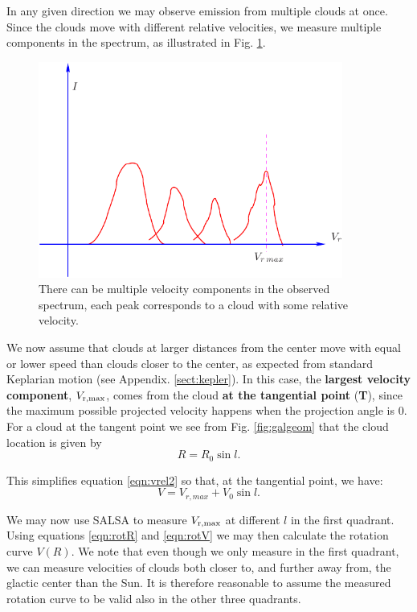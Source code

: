 In any given direction we may observe emission from multiple clouds at once. Since the clouds
move with different relative velocities, we measure multiple components in the spectrum, as illustrated
in Fig. \ref{fig:vmax}. 
\begin{figure}[ht]
\begin{center}
\includegraphics[width=10cm]{../figures/vmax.pdf}
\end{center}
\caption{There can be multiple velocity components in the observed spectrum, each peak corresponds
to a cloud with some relative velocity.}
\label{fig:vmax}
\end{figure}
We now assume that clouds at larger distances from the center move with equal
or lower speed than clouds closer to the center, as expected from standard
Keplarian motion (see Appendix. \ref{sect:kepler}).  In this case, the {\bf
largest velocity component}, $V_{\rm r,max}$, comes from the cloud {\bf at the
tangential point} ({\bf T}), since the maximum possible projected velocity
happens when the projection angle is 0.  For a cloud at the tangent point we
see from Fig. \ref{fig:galgeom} that the cloud location is given by 
\begin{equation}
	R = R_0 \sin l.
	\label{eqn:rotR}
\end{equation}

This simplifies equation \ref{eqn:vrel2} so that, at the tangential point, we
have: 
\begin{equation}
V = V_{r,max} + V_0 \sin l .
\label{eqn:rotV}
\end{equation}

We may now use SALSA to measure $V_{\rm r,max}$ at different $l$ in the first
quadrant.  Using equations \ref{eqn:rotR} and \ref{eqn:rotV} we may then
calculate the rotation curve $V(R)$. We note that even though we only measure
in the first quadrant, we can measure velocities of clouds both closer to, and
further away from, the glactic center than the Sun.  It is therefore reasonable
to assume the measured rotation curve to be valid also in the other three
quadrants.

